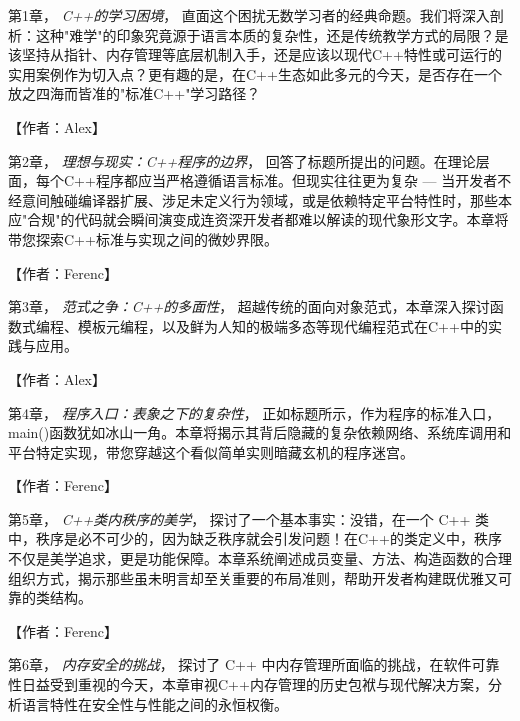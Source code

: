 
第1章， \textit{C++的学习困境}， 直面这个困扰无数学习者的经典命题。我们将深入剖析：这种"难学"的印象究竟源于语言本质的复杂性，还是传统教学方式的局限？是该坚持从指针、内存管理等底层机制入手，还是应该以现代C++特性或可运行的实用案例作为切入点？更有趣的是，在C++生态如此多元的今天，是否存在一个放之四海而皆准的"标准C++"学习路径？

【作者：Alex】

\hspace*{\fill}

第2章， \textit{理想与现实：C++程序的边界}， 回答了标题所提出的问题。在理论层面，每个C++程序都应当严格遵循语言标准。但现实往往更为复杂 --- 当开发者不经意间触碰编译器扩展、涉足未定义行为领域，或是依赖特定平台特性时，那些本应"合规"的代码就会瞬间演变成连资深开发者都难以解读的现代象形文字。本章将带您探索C++标准与实现之间的微妙界限。

【作者：Ferenc】

\hspace*{\fill}

第3章， \textit{范式之争：C++的多面性}， 超越传统的面向对象范式，本章深入探讨函数式编程、模板元编程，以及鲜为人知的极端多态等现代编程范式在C++中的实践与应用。

【作者：Alex】

\hspace*{\fill}

第4章， \textit{程序入口：表象之下的复杂性}， 正如标题所示，作为程序的标准入口，main()函数犹如冰山一角。本章将揭示其背后隐藏的复杂依赖网络、系统库调用和平台特定实现，带您穿越这个看似简单实则暗藏玄机的程序迷宫。

【作者：Ferenc】

\hspace*{\fill}

第5章， \textit{C++类内秩序的美学}， 探讨了一个基本事实：没错，在一个 C++ 类中，秩序是必不可少的，因为缺乏秩序就会引发问题！在C++的类定义中，秩序不仅是美学追求，更是功能保障。本章系统阐述成员变量、方法、构造函数的合理组织方式，揭示那些虽未明言却至关重要的布局准则，帮助开发者构建既优雅又可靠的类结构。

【作者：Ferenc】

\hspace*{\fill}

第6章， \textit{内存安全的挑战}， 探讨了 C++ 中内存管理所面临的挑战，在软件可靠性日益受到重视的今天，本章审视C++内存管理的历史包袱与现代解决方案，分析语言特性在安全性与性能之间的永恒权衡。

